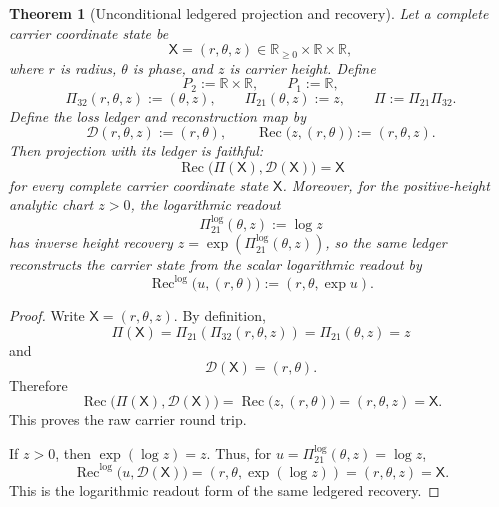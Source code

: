 \documentclass[11pt]{article}
\newtheorem{theorem}{Theorem}
\theoremstyle{definition}
\begin{document}

\begin{theorem}[Unconditional ledgered projection and recovery]\label{thm:g2-ledgered-projection}
Let a complete carrier coordinate state be
\[
\mathsf X=(r,\theta,z)\in \mathbb R_{\ge0}\times\mathbb R\times\mathbb R,
\]
where \(r\) is radius, \(\theta\) is phase, and \(z\) is carrier height.
Define
\[
P_2:=\mathbb R\times\mathbb R,\qquad
P_1:=\mathbb R,
\]
\[
\Pi_{32}(r,\theta,z):=(\theta,z),\qquad
\Pi_{21}(\theta,z):=z,\qquad
\Pi:=\Pi_{21}\Pi_{32}.
\]
Define the loss ledger and reconstruction map by
\[
\mathcal D(r,\theta,z):=(r,\theta),
\qquad
\operatorname{Rec}\bigl(z,(r,\theta)\bigr):=(r,\theta,z).
\]
Then projection with its ledger is faithful:
\[
\operatorname{Rec}\bigl(\Pi(\mathsf X),\mathcal D(\mathsf X)\bigr)=\mathsf X
\]
for every complete carrier coordinate state \(\mathsf X\).  Moreover, for the
positive-height analytic chart \(z>0\), the logarithmic readout
\[
\Pi^{\log}_{21}(\theta,z):=\log z
\]
has inverse height recovery \(z=\exp(\Pi^{\log}_{21}(\theta,z))\), so the same
ledger reconstructs the carrier state from the scalar logarithmic readout by
\[
\operatorname{Rec}^{\log}\bigl(u,(r,\theta)\bigr):=(r,\theta,\exp u).
\]
\end{theorem}

\begin{proof}
Write \(\mathsf X=(r,\theta,z)\).  By definition,
\[
\Pi(\mathsf X)=\Pi_{21}(\Pi_{32}(r,\theta,z))
=\Pi_{21}(\theta,z)=z
\]
and
\[
\mathcal D(\mathsf X)=(r,\theta).
\]
Therefore
\[
\operatorname{Rec}\bigl(\Pi(\mathsf X),\mathcal D(\mathsf X)\bigr)
=\operatorname{Rec}\bigl(z,(r,\theta)\bigr)
=(r,\theta,z)=\mathsf X.
\]
This proves the raw carrier round trip.

If \(z>0\), then \(\exp(\log z)=z\).  Thus, for
\(u=\Pi^{\log}_{21}(\theta,z)=\log z\),
\[
\operatorname{Rec}^{\log}\bigl(u,\mathcal D(\mathsf X)\bigr)
=(r,\theta,\exp(\log z))
=(r,\theta,z)=\mathsf X.
\]
This is the logarithmic readout form of the same ledgered recovery.
\end{proof}
\end{document}
